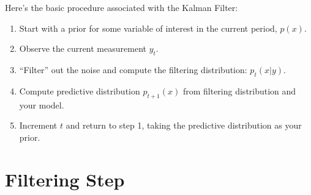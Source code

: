 \documentclass[a4paper,12pt]{article}
\begin{document}
Here's the basic procedure associated with the Kalman
Filter:
\begin{enumerate}
    \item Start with a prior for some variable of interest
	in the current period, $p(x)$.
    \item Observe the current measurement $y_t$.
    \item ``Filter'' out the noise and 
	compute the filtering distribution: $p_t(x | y)$.
    \item Compute predictive distribution $p_{t+1}(x)$
	from  filtering distribution and your model.
    \item Increment $t$ and return to step 1, taking
	the predictive distribution as your prior.

\end{enumerate}

\section{Filtering Step}
\end{document}
